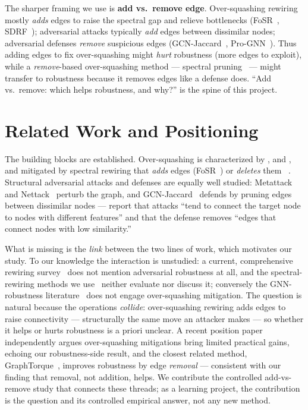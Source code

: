 \documentclass[10pt]{article}
\begin{document}
The sharper framing we use is \textbf{add vs.\ remove edge}. Over-squashing rewiring mostly \emph{adds} edges
to raise the spectral gap and relieve bottlenecks (FoSR~\citep{karhadkar2023fosr},
SDRF~\citep{topping2022understanding}); adversarial attacks typically \emph{add} edges between dissimilar
nodes; adversarial defenses \emph{remove} suspicious edges (GCN-Jaccard~\citep{wu2019jaccard},
Pro-GNN~\citep{jin2020prognn}). Thus adding edges to fix over-squashing might \emph{hurt} robustness (more
edges to exploit), while a \emph{remove}-based over-squashing method --- spectral
pruning~\citep{jamadandi2024spectral} --- might transfer to robustness because it removes edges like a defense
does. ``Add vs.\ remove: which helps robustness, and why?'' is the spine of this project.

\section{Related Work and Positioning}
The building blocks are established. Over-squashing is characterized by \citet{alon2021bottleneck},
\citet{topping2022understanding} and \citet{digiovanni2023oversquashing}, and mitigated by spectral
rewiring that \emph{adds} edges (FoSR~\citep{karhadkar2023fosr}) or \emph{deletes} them
~\citep{jamadandi2024spectral}. Structural adversarial attacks and defenses are equally well studied:
Metattack~\citep{zugner2019metattack} and Nettack~\citep{zugner2018nettack} perturb the graph, and
GCN-Jaccard~\citep{wu2019jaccard} defends by pruning edges between dissimilar nodes --- \citet{wu2019jaccard}
report that attacks ``tend to connect the target node to nodes with different features'' and that the
defense removes ``edges that connect nodes with low similarity.''

What is missing is the \emph{link} between the two lines of work, which motivates our study. To our
knowledge the interaction is unstudied: a current, comprehensive rewiring
survey~\citep{attali2024rewiringsurvey} does not mention adversarial robustness at all, and the
spectral-rewiring methods we use~\citep{karhadkar2023fosr, jamadandi2024spectral} neither evaluate nor
discuss it; conversely the GNN-robustness literature~\citep{wu2019jaccard, foth2025gtrobust} does not
engage over-squashing mitigation. The question is natural because the operations \emph{collide}:
over-squashing rewiring adds edges to raise connectivity --- structurally the same move an attacker makes
--- so whether it helps or hurts robustness is a priori unclear. A recent position
paper~\citep{kormann2026position} independently argues over-squashing mitigations bring limited practical
gains, echoing our robustness-side result, and the closest related method,
GraphTorque~\citep{huang2025graphtorque}, improves robustness by edge \emph{removal} --- consistent with
our finding that removal, not addition, helps. We contribute the controlled add-vs-remove study that
connects these threads; as a learning project, the contribution is the question and its controlled
empirical answer, not any new method.
\end{document}

